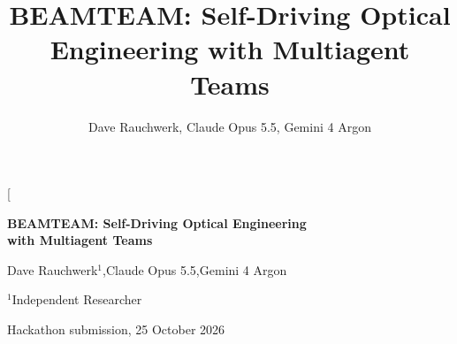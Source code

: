\documentclass[10pt,twocolumn,letterpaper]{article}
\title{\textbf{BEAMTEAM: Self-Driving Optical Engineering with Multiagent Teams}}
\author{Dave Rauchwerk, Claude Opus 5.5, Gemini 4 Argon}
\date{}
\begin{document}
\twocolumn[{%
  \vspace*{-1.6em}
  \begin{center}
    {\Large\bfseries BEAMTEAM: Self-Driving Optical Engineering\\[0.1em]
     with Multiagent Teams\par}
    \vspace{0.7em}
    {\normalsize Dave Rauchwerk$^{1}$,\enspace Claude Opus 5.5,\enspace Gemini 4 Argon\par}
    \vspace{0.2em}
    {\small $^{1}$Independent Researcher\par}
    \vspace{0.1em}
    {\small Hackathon submission, 25 October 2026\par}
  \end{center}
  \vspace{0.2em}
  \begin{center}
    \begin{minipage}{0.9\textwidth}\small

\end{minipage}
\end{center}}
\end{document}
